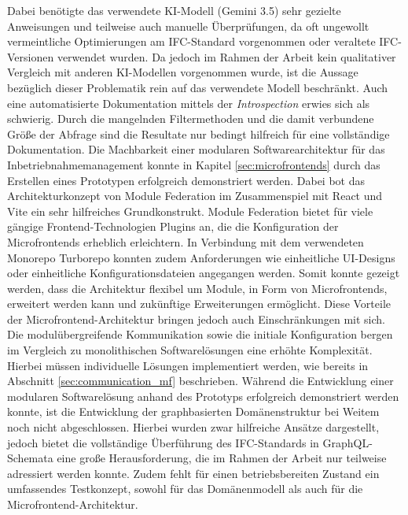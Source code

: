 Dabei benötigte das verwendete KI-Modell (Gemini 3.5) sehr gezielte Anweisungen und teilweise auch manuelle Überprüfungen, da oft ungewollt vermeintliche Optimierungen am IFC-Standard vorgenommen oder veraltete IFC-Versionen verwendet wurden.  Da jedoch im Rahmen der Arbeit kein qualitativer Vergleich mit anderen KI-Modellen vorgenommen wurde, ist die Aussage bezüglich dieser Problematik rein auf das verwendete Modell beschränkt. Auch eine automatisierte Dokumentation mittels der \textit{Introspection} erwies sich als schwierig. Durch die mangelnden Filtermethoden und die damit verbundene Größe der Abfrage sind die Resultate nur bedingt hilfreich für eine vollständige Dokumentation. \newline
Die Machbarkeit einer modularen Softwarearchitektur für das Inbetriebnahmemanagement konnte in Kapitel \ref{sec:microfrontends} durch das Erstellen eines Prototypen erfolgreich demonstriert werden. Dabei bot das Architekturkonzept von
Module Federation im Zusammenspiel mit React und Vite ein sehr hilfreiches Grundkonstrukt. Module Federation bietet für viele gängige Frontend-Technologien Plugins an, die die Konfiguration der Microfrontends erheblich erleichtern. In Verbindung mit dem verwendeten Monorepo Turborepo konnten zudem Anforderungen wie einheitliche UI-Designs oder einheitliche Konfigurationsdateien angegangen werden. Somit konnte gezeigt werden, dass die Architektur flexibel um Module, in Form von Microfrontends, erweitert werden kann und zukünftige Erweiterungen ermöglicht. Diese Vorteile der Microfrontend-Architektur bringen jedoch auch Einschränkungen mit sich. Die modulübergreifende Kommunikation sowie die initiale Konfiguration bergen im Vergleich zu monolithischen Softwarelösungen eine erhöhte Komplexität. Hierbei müssen individuelle Lösungen implementiert werden, wie bereits in Abschnitt \ref{sec:communication_mf} beschrieben. \newline
Während die Entwicklung einer modularen Softwarelösung anhand des Prototyps \cite{eigener_code_usb} erfolgreich demonstriert werden konnte, ist die Entwicklung der graphbasierten Domänenstruktur bei Weitem noch nicht abgeschlossen. Hierbei wurden zwar hilfreiche Ansätze dargestellt, jedoch bietet die vollständige Überführung des IFC-Standards in GraphQL-Schemata eine große Herausforderung, die im Rahmen der Arbeit nur teilweise adressiert werden konnte. Zudem fehlt für einen betriebsbereiten Zustand ein umfassendes Testkonzept, sowohl für das Domänenmodell als auch für die Microfrontend-Architektur.
